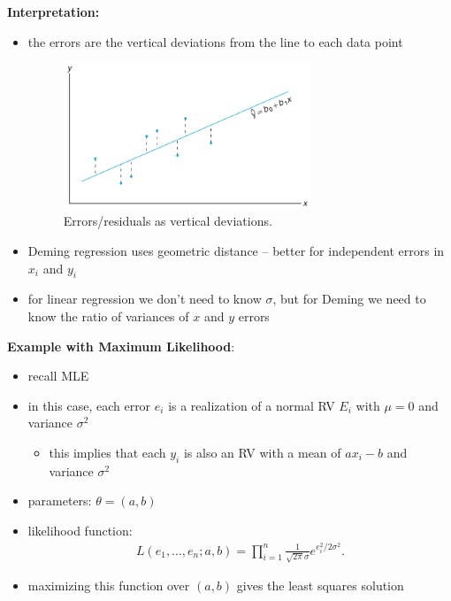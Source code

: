 \documentclass[10pt]{article}
\begin{document}
\textbf{Interpretation:} 
\begin{itemize}
    \item the errors are the vertical deviations from the line to each data point
        \begin{figure}[H]
            \centering
            \includegraphics[width=0.7\textwidth]{leastSquares}
            \caption{Errors/residuals as vertical deviations.}
            \label{fig:leastSquares}
        \end{figure}
    \item Deming regression uses geometric distance -- better for independent errors in $x_i$ and $y_i$ 
    \item for linear regression we don't need to know $\sigma$, but for Deming we need to know the ratio of variances of $x$ and $y $ errors
\end{itemize}
\textbf{Example with Maximum Likelihood}:
\begin{itemize}
    \item recall MLE 
    \item in this case, each error $e_i$ is a realization of a normal RV $E_i$ with $\mu=0$ and variance $\sigma^2$
        \begin{itemize}
            \item this implies that each $y_i$ is also an RV with a mean of $ax_i - b$ and variance $\sigma^2$
        \end{itemize}
    \item parameters: $\theta = (a, b)$ 
    \item likelihood function: 
        \begin{gather*}
            L(e_1, \ldots, e_n; a,b) = \prod_{i=1}^{n} \frac{1}{\sqrt{2\pi} \sigma} e^{e_i^2 / 2\sigma^2} 
        .\end{gather*}
    \item maximizing this function over $(a,b)$ gives the least squares solution
\end{itemize}
\end{document}
